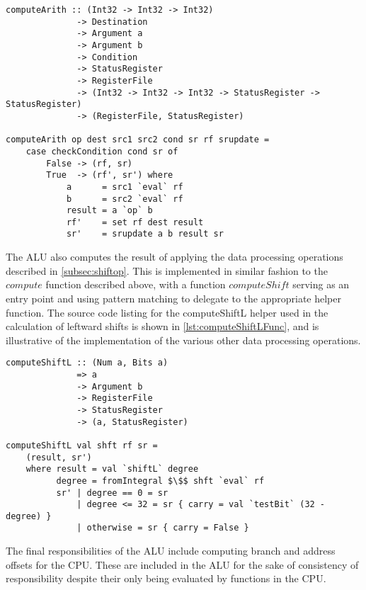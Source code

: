 \begin{lstlisting}[mathescape,numbers=none,caption={The $computeArith$ function},label={lst:computeArithFunc}]
computeArith :: (Int32 -> Int32 -> Int32)
              -> Destination
              -> Argument a
              -> Argument b
              -> Condition
              -> StatusRegister
              -> RegisterFile
              -> (Int32 -> Int32 -> Int32 -> StatusRegister -> StatusRegister)
              -> (RegisterFile, StatusRegister)

computeArith op dest src1 src2 cond sr rf srupdate =
    case checkCondition cond sr of
        False -> (rf, sr)
        True  -> (rf', sr') where
            a      = src1 `eval` rf
            b      = src2 `eval` rf
            result = a `op` b
            rf'    = set rf dest result
            sr'    = srupdate a b result sr
\end{lstlisting}

The ALU also computes the result of applying the data processing operations described in \autoref{subsec:shiftop}. This is implemented in similar fashion to the $compute$ function described above, with a function $computeShift$ serving as an entry point and using pattern matching to delegate to the appropriate helper function. The source code listing for the computeShiftL helper used in the calculation of leftward shifts is shown in \autoref{lst:computeShiftLFunc}, and is illustrative of the implementation of the various other data processing operations.

\begin{lstlisting}[mathescape,numbers=none,caption={The $computeShiftL$ function},label={lst:computeShiftLFunc}]
computeShiftL :: (Num a, Bits a)
              => a
              -> Argument b
              -> RegisterFile
              -> StatusRegister
              -> (a, StatusRegister)

computeShiftL val shft rf sr =
    (result, sr')
    where result = val `shiftL` degree
          degree = fromIntegral $\$$ shft `eval` rf
          sr' | degree == 0 = sr
              | degree <= 32 = sr { carry = val `testBit` (32 - degree) }
              | otherwise = sr { carry = False }
\end{lstlisting}

The final responsibilities of the ALU include computing branch and address offsets for the CPU. These are included in the ALU for the sake of consistency of responsibility despite their only being evaluated by functions in the CPU.

